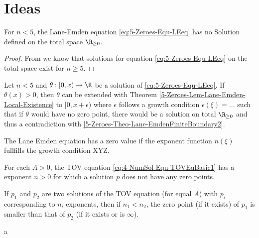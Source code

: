 \section{Ideas}

%
%
%
\begin{theorem}
	\label{5-Zeroes-Theo-Lane-EmdenFiniteBoundary2}
	For $n<5$, the Lane-Emden equation \ref{eq:5-Zeroes-Equ-LEeq} has no Solution defined on the total space $\R_{\geq0}$.
\end{theorem}
\begin{proof}
	From \cite{quittnerSuperlinearParabolicProblems2007} we know that solutions for equation \ref{eq:5-Zeroes-Equ-LEeq} on the total space exist for $n\geq5$.
	
\end{proof}
%
%
%
\begin{theorem}
	\label{5-Zeroes-Theo-Lane-EmdenFiniteBoundary3}
	Let $n<5$ and $\theta:[0,x)\rightarrow\R$ be a solution of \ref{eq:5-Zeroes-Equ-LEeq}. If $\theta(x)>0$, then $\theta$ can be extended with Theorem \ref{5-Zeroes-Lem-Lane-Emden-Local-Existence}
	to $[0,x+\epsilon)$ where $\epsilon$ follows a growth condition $\epsilon(\xi)=...$ such that if $\theta$ would have no zero point, there would be a solution on total 
	$\R_{\geq0}$ and thus a contradiction with \ref{5-Zeroes-Theo-Lane-EmdenFiniteBoundary2}.
\end{theorem}
\begin{theorem}
	The Lane Emden equation has a zero value if the exponent function $n(\xi)$ fullfills the growth condition XYZ.
\end{theorem}


\begin{theorem}
	For each $A>0$, the TOV equation \ref{eq:4-NumSol-Equ-TOVEqBasic1} has a exponent $n>0$ for which a solution $p$ does not have any zero points.
\end{theorem}
\begin{theorem}
	If $p_1$ and $p_2$ are two solutions of the TOV equation (for equal $A$) with $p_i$ corresponding to $n_i$ exponents, then if $n_1<n_2$, the zero 
	point (if it exists) of $p_1$ is smaller than that of $p_2$ (if it exists or is $\infty$).
\end{theorem}
\begin{theorem}
	a 
\end{theorem}




